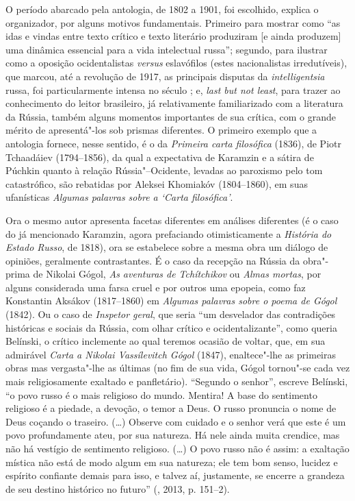 {{{O período abarcado pela antologia, de 1802 a 1901, foi escolhido, explica o
organizador, por alguns motivos fundamentais. Primeiro para mostrar como
``as idas e vindas entre texto crítico e texto literário produziram [e ainda produzem] uma dinâmica essencial para a vida intelectual
russa''; segundo, para ilustrar como a oposição ocidentalistas \emph{versus}
eslavófilos (estes nacionalistas irredutíveis), que marcou, até a revolução
de 1917, as principais disputas da \emph{intelligentsia} russa, foi
particularmente intensa no século ; e, \emph{last but not least}, para
trazer ao conhecimento do leitor brasileiro, já relativamente
familiarizado com a literatura da Rússia, também alguns momentos
importantes de sua crítica, com o grande mérito de apresentá"-los sob
prismas diferentes. O primeiro exemplo que a antologia fornece, nesse sentido, é o da \emph{Primeira carta filosófica} (1836),
 de Piotr Tchaadáiev (1794--1856), da qual a
expectativa de Karamzin e a sátira de Púchkin quanto à relação
Rússia"--Ocidente, levadas ao paroxismo pelo tom catastrófico, são
rebatidas por Aleksei Khomiakóv (1804--1860), em suas ufanísticas \emph{Algumas
palavras sobre a `Carta filosófica'}.

Ora o mesmo autor apresenta facetas diferentes em análises diferentes (é o caso do já mencionado Karamzin, agora prefaciando otimisticamente a
\emph{História do Estado Russo}, de 1818), ora se estabelece sobre a
mesma obra um diálogo de opiniões, geralmente contrastantes. É o caso da
recepção na Rússia da obra"-prima de Nikolai Gógol, \emph{As aventuras de Tchítchikov} ou \emph{Almas mortas}, por alguns considerada uma
farsa cruel e por outros uma epopeia, como faz Konstantin Aksákov (1817--1860) em
\emph{Algumas palavras sobre o poema de Gógol} (1842). Ou o caso de \emph{Inspetor geral}, que seria ``um desvelador das contradições históricas e
sociais da Rússia, com olhar crítico e ocidentalizante'', como queria
Belínski, o crítico inclemente ao qual teremos ocasião de
voltar, que, em sua admirável \emph{Carta a Nikolai Vassílevitch Gógol} (1847), enaltece"-lhe as primeiras obras mas vergasta"-lhe as últimas (no
fim de sua vida, Gógol tornou"-se cada vez mais religiosamente exaltado
e panfletário). ``Segundo o senhor'', escreve Belínski, ``o povo russo
é o mais religioso do mundo. Mentira! A base do sentimento religioso é a
piedade, a devoção, o temor a Deus. O russo pronuncia o nome de Deus
coçando o traseiro. (\ldots{}) Observe com cuidado e o senhor verá que este é
um povo profundamente ateu, por sua natureza. Há nele ainda muita
crendice, mas não há vestígio de sentimento religioso. (\ldots{}) O povo
russo não é assim: a exaltação mística não está de modo algum em sua
natureza; ele tem bom senso, lucidez e espírito confiante demais para
isso, e talvez aí, justamente, se encerre a grandeza de seu destino
histórico no futuro'' (, 2013, p. 151--2).

}}}
